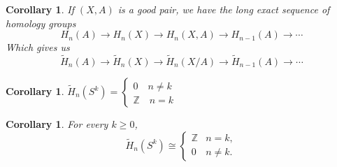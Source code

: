 \documentclass[11pt,a4paper]{article}
\theoremstyle{definition}
\theoremstyle{plain}
\newtheorem{corollary}[definition]{Corollary}
\theoremstyle{remark}
\newcommand{\Z}{\mathbb{Z}}
\newcommand{\1}{\mathbbm{1}}
\begin{document}
\begin{corollary}
    If $(X,A)$ is a good pair, we have the long exact sequence of homology groups
    $$H_n(A) \to H_n(X) \to H_n(X,A) \to H_{n-1}(A) \to \cdots$$
    Which gives us 
    $$\tilde{H}_n(A) \to \tilde{H}_n(X) \to \tilde{H}_n(X/A) \to \tilde{H}_{n-1} (A) \to \cdots$$
\end{corollary}

\begin{corollary}
    $\tilde{H}_n(S^k) = \begin{cases}
        0 \quad n \ne k \\
        \Z \quad n = k
    \end{cases}$
\end{corollary}

\begin{corollary}
    For every $k \geq 0$,
    \[
        \widetilde H_n(S^k) \cong 
        \begin{cases}
            \mathbb Z & n = k,\\
            0 & n \neq k.
        \end{cases}
    \]
\end{corollary}
\end{document}
